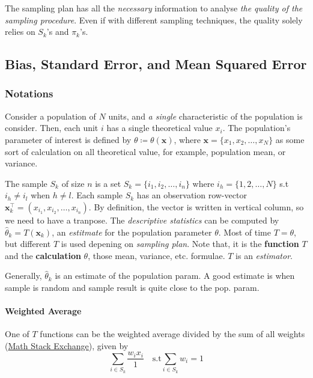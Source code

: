 The sampling plan has all the \emph{necessary} information to analyse \emph{the quality of the sampling procedure}. Even if with different sampling techniques, the quality solely relies on $S_k$'s and $\pi_k$'s.

\subsection{Bias, Standard Error, and Mean Squared Error}
\subsubsection{Notations}
Consider a population of $N$ units, and \emph{a single} characteristic of the population is consider. Then, each unit $i$ has a single theoretical value $x_i$. The population's parameter of interest is defined by 
$\theta\coloneq\theta(\boldsymbol{x})$, where $\boldsymbol{x}=\{x_1,x_2,\ldots,x_N\}$ as some sort of calculation on all theoretical value, for example, population mean, or variance.

The sample $S_k$ of size $n$ is a set $S_k=\{i_1,i_2,\ldots,i_n\}$ where $i_h=\{1,2,\ldots,N\}$ s.t $i_h\neq i_l$ when $h\neq l$. Each sample $S_k$ has an observation row-vector 
$\boldsymbol{x}^\top_k=\left(x_{i_1},x_{i_2},\ldots,x_{i_n}\right)$. By definition, the vector is written in vertical column, so we need to have a tranpose. The \emph{descriptive statistics} can be computed by 
$\hat{\theta}_k=T(\boldsymbol{x}_k)$, an \emph{estitmate} for the population parameter $\theta$. Most of time $T=\theta$, but different $T$ is used depening on \emph{sampling plan}. Note that, it is the \textbf{function} $T$ 
and the \textbf{calculation} $\theta$, those mean, variance, etc. formulae. $T$ is an \emph{estimator}.

Generally, $\hat{\theta}_k$ is an estimate of the population param. A good estimate is when sample is random and sample result is quite close to the pop. param.

\paragraph{Weighted Average}
One of $T$ functions can be the weighted average divided by the sum of all weights (\href{https://math.stackexchange.com/questions/3480195/the-definition-of-expected-value-and-weighted-average}{Math Stack Exchange}), given by
\begin{equation}
    \sum_{i\in S_k}\frac{w_ix_i}{1}\quad\mathrm{s.t}\sum_{i\in S_k}w_i=1
\end{equation}

